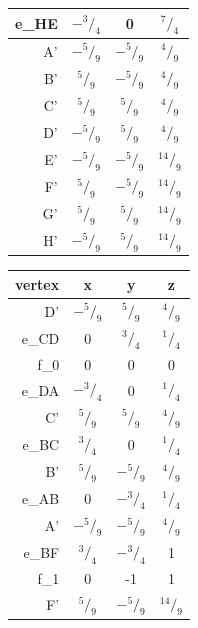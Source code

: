 \documentclass{article}
\newcommand*\rfrac[2]{{}^{#1}\!/_{#2}}%
\begin{document}
\begin{center}
\begin{table}[!h]
\begin{minipage}{.5\linewidth}
\begin{tabular}{ | r | c | c | c | }
    e_{HE} & $ -\rfrac{3}{4} $ & 0 & $ \rfrac{7}{4} $ \\ \hline
    A' & $ -\rfrac{5}{9} $ & $ -\rfrac{5}{9} $ & $ \rfrac{4}{9} $ \\ \hline
    B' & $ \rfrac{5}{9} $ & $ -\rfrac{5}{9} $ & $ \rfrac{4}{9} $ \\ \hline
    C' & $ \rfrac{5}{9} $ & $ \rfrac{5}{9} $ & $ \rfrac{4}{9} $ \\ \hline
    D' & $ -\rfrac{5}{9} $ & $ \rfrac{5}{9} $ & $ \rfrac{4}{9} $ \\ \hline
    E' & $ -\rfrac{5}{9} $ & $ -\rfrac{5}{9} $ & $ \rfrac{14}{9} $ \\ \hline    
    F' & $ \rfrac{5}{9} $ & $ -\rfrac{5}{9} $ & $ \rfrac{14}{9} $ \\ \hline
    G' & $ \rfrac{5}{9} $ & $ \rfrac{5}{9} $ & $ \rfrac{14}{9} $ \\ \hline    
    H' & $ -\rfrac{5}{9} $ & $ \rfrac{5}{9} $ & $ \rfrac{14}{9} $ \\ \hline
    \hline
  \end{tabular}
    \end{minipage}%
    \begin{minipage}{.5\linewidth}
      \centering
        \begin{tabular}{ | r | c | c | c | }
    \hline
    vertex & x & y & z \\ \hline
    D' & $ -\rfrac{5}{9} $ & $ \rfrac{5}{9} $ & $ \rfrac{4}{9} $ \\ \hline
    e_{CD} & 0 & $ \rfrac{3}{4} $ & $ \rfrac{1}{4} $ \\ \hline
    f_0 & 0 & 0 & 0 \\ \hline
    e_{DA} & $ -\rfrac{3}{4} $ & 0 & $ \rfrac{1}{4} $ \\ \hline
    C' & $ \rfrac{5}{9} $ & $ \rfrac{5}{9} $ & $ \rfrac{4}{9} $ \\ \hline    
    e_{BC} & $ \rfrac{3}{4} $ & 0 & $ \rfrac{1}{4} $ \\ \hline
    B' & $ \rfrac{5}{9} $ & $ -\rfrac{5}{9} $ & $ \rfrac{4}{9} $ \\ \hline
    e_{AB} & 0 & $ -\rfrac{3}{4} $ & $ \rfrac{1}{4} $ \\ \hline
    A' & $ -\rfrac{5}{9} $ & $ -\rfrac{5}{9} $ & $ \rfrac{4}{9} $ \\ \hline
    e_{BF} & $ \rfrac{3}{4} $ & $ -\rfrac{3}{4} $ & 1 \\ \hline
    f_1 & 0 & -1 & 1 \\ \hline    
    F' & $ \rfrac{5}{9} $ & $ -\rfrac{5}{9} $ & $ \rfrac{14}{9} $ \\ \hline

\end{tabular}
\end{minipage}
\end{table}
\end{center}
\end{document}
